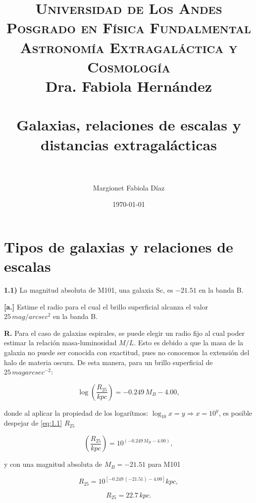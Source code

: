 \documentclass[paper=a4, fontsize=10pt]{scrartcl} %
\title{	
\normalfont \normalsize 
\textsc{Universidad de Los Andes \\
Posgrado en Física Fundalmental \\  Astronomía Extragaláctica y Cosmología} \\ Dra. Fabiola Hernández \\ [25pt] %
\horrule{0.5pt} \\[0.4cm] %
\huge Galaxias, relaciones de escalas y distancias extragalácticas \\ %
\horrule{2pt} \\[0.5cm] %
}
\author{Margionet Fabiola D\'iaz} %
\date{\normalsize\today} %
\begin{document}
\maketitle %


\section{Tipos de galaxias y relaciones de escalas}

{\bf{1.1)}} La magnitud absoluta de M101, una galaxia Sc, es $-21.51$ en la banda B. \label{ex:1.1} 

\vspace{0.5cm} 


 
{\bf{[a.]}} Estime el radio para el cual el brillo superficial alcanza el valor $25 \, mag/arcsec^2$ en la banda B.

{\bf{R.}} Para el caso de galaxias espirales, se puede elegir un radio fijo al cual poder estimar la relación masa-luminosidad $M/L$. Esto es debido a que la masa de la galaxia no puede ser conocida con exactitud, pues no conocemos la extensión del halo de materia oscura. De esta manera, para un brillo superficial de $25 \, mag arcsec^{-2}$: 

\begin{equation} \label{eq:1.1}
\log \left(\frac{R_{25}}{kpc} \right) = -0.249 \, M_B - 4.00,
\end{equation}

donde al aplicar la propiedad de los logarítmos: $\log_{10} x = y \Rightarrow x = 10^y$, es posible despejar de \eqref{eq:1.1} $R_{25}$

\begin{equation*}
\left(\frac{R_{25}}{kpc} \right) = 10^{(-0.249 \, M_B - 4.00)},
\end{equation*}

y con una magnitud absoluta de $M_B = -21.51$ para M101 

\begin{equation*}
R_{25} = 10^{[-0.249 \, (-21.51) - 4.00]} kpc,
\end{equation*}

\begin{equation} \label{eq:1.2} 
R_{25} = 22.7 \, kpc.
\end{equation}
\end{document}
